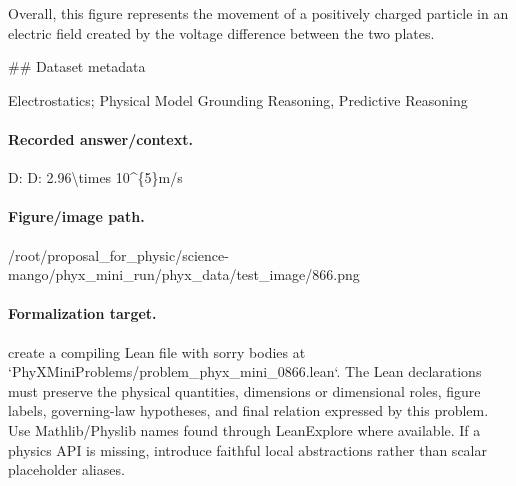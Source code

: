 Overall, this figure represents the movement of a positively charged particle in an electric field created by the voltage difference between the two plates.

\#\# Dataset metadata

Electrostatics; Physical Model Grounding Reasoning, Predictive Reasoning

\paragraph{Recorded answer/context.}
D: D: 2.96\textbackslash{}times 10\textasciicircum{}\{5\}m/s

\paragraph{Figure/image path.}
/root/proposal\_for\_physic/science-mango/phyx\_mini\_run/phyx\_data/test\_image/866.png

\paragraph{Formalization target.}
create a compiling Lean file with sorry bodies at `PhyXMiniProblems/problem\_phyx\_mini\_0866.lean`. The Lean declarations must preserve the physical quantities, dimensions or dimensional roles, figure labels, governing-law hypotheses, and final relation expressed by this problem.
Use Mathlib/Physlib names found through LeanExplore where available. If a physics API is missing, introduce faithful local abstractions rather than scalar placeholder aliases.

